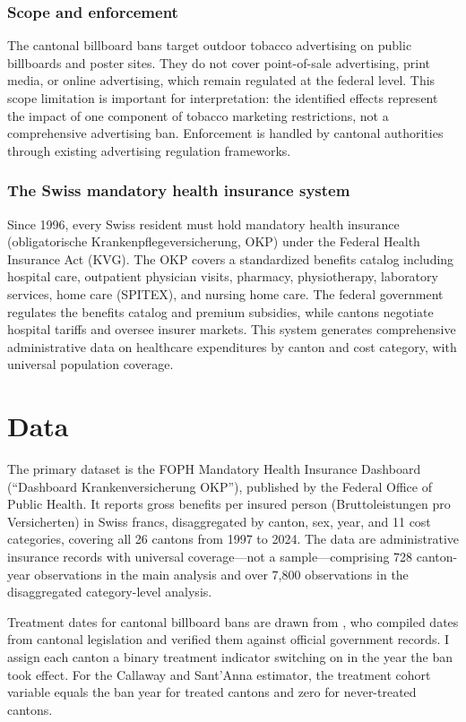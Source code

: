 \documentclass[12pt]{article}
\begin{document}
\subsubsection*{Scope and enforcement} The cantonal billboard bans target outdoor tobacco advertising on public billboards and poster sites. They do not cover point-of-sale advertising, print media, or online advertising, which remain regulated at the federal level. This scope limitation is important for interpretation: the identified effects represent the impact of one component of tobacco marketing restrictions, not a comprehensive advertising ban. Enforcement is handled by cantonal authorities through existing advertising regulation frameworks.

\subsubsection*{The Swiss mandatory health insurance system} Since 1996, every Swiss resident must hold mandatory health insurance (obligatorische Krankenpflegeversicherung, OKP) under the Federal Health Insurance Act (KVG). The OKP covers a standardized benefits catalog including hospital care, outpatient physician visits, pharmacy, physiotherapy, laboratory services, home care (SPITEX), and nursing home care. The federal government regulates the benefits catalog and premium subsidies, while cantons negotiate hospital tariffs and oversee insurer markets. This system generates comprehensive administrative data on healthcare expenditures by canton and cost category, with universal population coverage.


\section{Data}

The primary dataset is the FOPH Mandatory Health Insurance Dashboard (``Dashboard Krankenversicherung OKP''), published by the Federal Office of Public Health. It reports gross benefits per insured person (Bruttoleistungen pro Versicherten) in Swiss francs, disaggregated by canton, sex, year, and 11 cost categories, covering all 26 cantons from 1997 to 2024. The data are administrative insurance records with universal coverage---not a sample---comprising 728 canton-year observations in the main analysis and over 7,800 observations in the disaggregated category-level analysis.

Treatment dates for cantonal billboard bans are drawn from \citet{stoller2026billboard}, who compiled dates from cantonal legislation and verified them against official government records. I assign each canton a binary treatment indicator switching on in the year the ban took effect. For the Callaway and Sant'Anna estimator, the treatment cohort variable equals the ban year for treated cantons and zero for never-treated cantons.
\end{document}
